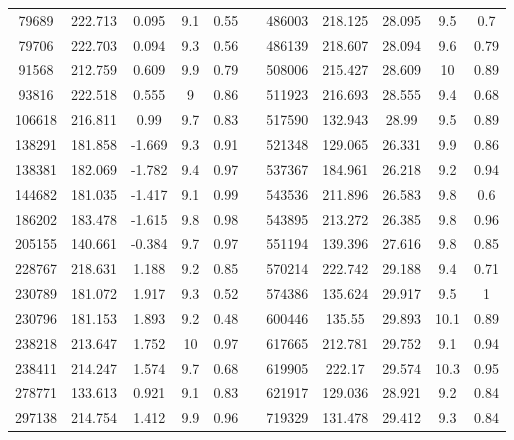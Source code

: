 \documentclass[a4paper,fleqn,usenatbib]{mnras}
\begin{document}
\begin{table*}
\begin{tabular}{ccccclccccc}
     79689 & 222.713 &  0.095 &                    9.1 &       0.55 &     &    486003 & 218.125 & 28.095 &                    9.5 &       0.7  \\
     79706 & 222.703 &  0.094 &                    9.3 &       0.56 &     &    486139 & 218.607 & 28.094 &                    9.6 &       0.79 \\
     91568 & 212.759 &  0.609 &                    9.9 &       0.79 &     &    508006 & 215.427 & 28.609 &                   10   &       0.89 \\
     93816 & 222.518 &  0.555 &                    9   &       0.86 &     &    511923 & 216.693 & 28.555 &                    9.4 &       0.68 \\
    106618 & 216.811 &  0.99  &                    9.7 &       0.83 &     &    517590 & 132.943 & 28.99  &                    9.5 &       0.89 \\
    138291 & 181.858 & -1.669 &                    9.3 &       0.91 &     &    521348 & 129.065 & 26.331 &                    9.9 &       0.86 \\
    138381 & 182.069 & -1.782 &                    9.4 &       0.97 &     &    537367 & 184.961 & 26.218 &                    9.2 &       0.94 \\
    144682 & 181.035 & -1.417 &                    9.1 &       0.99 &     &    543536 & 211.896 & 26.583 &                    9.8 &       0.6  \\
    186202 & 183.478 & -1.615 &                    9.8 &       0.98 &     &    543895 & 213.272 & 26.385 &                    9.8 &       0.96 \\
    205155 & 140.661 & -0.384 &                    9.7 &       0.97 &     &    551194 & 139.396 & 27.616 &                    9.8 &       0.85 \\
    228767 & 218.631 &  1.188 &                    9.2 &       0.85 &     &    570214 & 222.742 & 29.188 &                    9.4 &       0.71 \\
    230789 & 181.072 &  1.917 &                    9.3 &       0.52 &     &    574386 & 135.624 & 29.917 &                    9.5 &       1    \\
    230796 & 181.153 &  1.893 &                    9.2 &       0.48 &     &    600446 & 135.55  & 29.893 &                   10.1 &       0.89 \\
    238218 & 213.647 &  1.752 &                   10   &       0.97 &     &    617665 & 212.781 & 29.752 &                    9.1 &       0.94 \\
    238411 & 214.247 &  1.574 &                    9.7 &       0.68 &     &    619905 & 222.17  & 29.574 &                   10.3 &       0.95 \\
    278771 & 133.613 &  0.921 &                    9.1 &       0.83 &     &    621917 & 129.036 & 28.921 &                    9.2 &       0.84 \\
    297138 & 214.754 &  1.412 &                    9.9 &       0.96 &     &    719329 & 131.478 & 29.412 &                    9.3 &       0.84 \\\cline{1-5}
\cline{7-11}
\end{tabular}
\label{table}
\end{table*}
\end{document}
